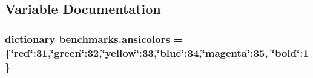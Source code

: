 \subsection{Variable Documentation}
\hypertarget{namespacebenchmarks_ae21f1a1e4b67bc60d626b49fa14b045d}{}
\subsubsection[{ansicolors}]{\setlength{\rightskip}{0pt plus 5cm}dictionary benchmarks.\+ansicolors = \{\char`\"{}red\char`\"{}\+:31,\char`\"{}green\char`\"{}\+:32,\char`\"{}yellow\char`\"{}\+:33,\char`\"{}blue\char`\"{}\+:34,\char`\"{}magenta\char`\"{}\+:35, \char`\"{}bold\char`\"{}\+:1 \}}\label{namespacebenchmarks_ae21f1a1e4b67bc60d626b49fa14b045d}
